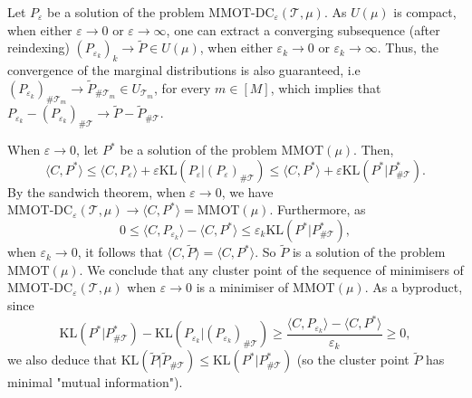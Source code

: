 \documentclass{article}
\begin{document}
Let $P_{\varepsilon}$ be a solution of the problem $\text{MMOT-DC}_{\varepsilon}(\mathcal T, \mu)$. 
As $U(\mu)$ is compact, when either $\varepsilon \to 0$ or $\varepsilon \to \infty$, 
one can extract a converging subsequence (after reindexing) 
$(P_{\varepsilon_k})_k \to \widetilde{P} \in U(\mu)$, 
when either $\varepsilon_k \to 0$ or $\varepsilon_k \to \infty$. 
Thus, the convergence of the marginal distributions is also guaranteed, i.e 
$(P_{\varepsilon_k})_{\# \mathcal T_m} \to \widetilde{P}_{\# \mathcal T_m} \in U_{\mathcal T_m}$, for every $m \in [M]$, 
which implies that $P_{\varepsilon_k} - (P_{\varepsilon_k})_{\# \mathcal T} \to \widetilde{P} - \widetilde{P}_{\# \mathcal T}$.

When $\varepsilon \to 0$, let $P^{*}$ be a solution of the problem $\text{MMOT}(\mu)$. Then,
\begin{equation*}
  \langle C, P^* \rangle \leq \langle C, P_{\varepsilon} \rangle + 
  \varepsilon \text{KL}(P_{\varepsilon} \vert (P_{\varepsilon})_{\# \mathcal T}) \leq 
  \langle C, P^{*} \rangle + \varepsilon \text{KL}(P^* \vert P^*_{\# \mathcal T}).
\end{equation*}
By the sandwich theorem, when $\varepsilon \to 0$, we have 
$\text{MMOT-DC}_{\varepsilon}(\mathcal T, \mu) \to \langle C, P^* \rangle = \text{MMOT}(\mu)$. 
Furthermore, as
\begin{equation*}
  0 \leq \langle C, P_{\varepsilon_k} \rangle - \langle C, P^* \rangle 
  \leq \varepsilon_k \text{KL}(P^* \vert P^*_{\# \mathcal T}),
\end{equation*}
when $\varepsilon_k \to 0$, it follows that $\langle C, \widetilde{P} \rangle = \langle C, P^* \rangle$. 
So $\widetilde{P}$ is a solution of the problem $\text{MMOT}(\mu)$. We conclude that 
any cluster point of the sequence of minimisers of $\text{MMOT-DC}_{\varepsilon}(\mathcal T, \mu)$ when 
$\varepsilon \to 0$ is a minimiser of $\text{MMOT}(\mu)$. As a byproduct, since       
\begin{equation*}
  \text{KL}(P^* \vert P^*_{\# \mathcal T}) - \text{KL}(P_{\varepsilon_k} \vert (P_{\varepsilon_k})_{\# \mathcal T}) \geq
  \frac{\langle C, P_{\varepsilon_k} \rangle - \langle C, P^* \rangle}{\varepsilon_k} \geq 0,
\end{equation*}
we also deduce that $\text{KL}(\widetilde{P} \vert \widetilde{P}_{\# \mathcal T}) \leq \text{KL}(P^* \vert P^*_{\# \mathcal T})$ 
(so the cluster point $\widetilde{P}$ has minimal "mutual information").
\end{document}

